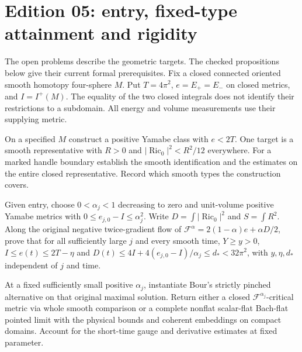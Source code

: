\section{Edition 05: entry, fixed-type attainment and rigidity}
\label{sec:ed05}
The open problems describe the geometric targets. The checked propositions below give their current formal prerequisites. Fix a closed connected oriented
smooth homotopy four-sphere $M$. Put $T=4\pi^2$,
$e=E_+=E_-$ on closed metrics, and $I=I^+(M)$.
The equality of the two closed integrals does not identify their restrictions
to a subdomain. All energy and volume measurements use their supplying metric.

\begin{openproblem}
\label{prop:ed05-entry}
On a specified $M$ construct a positive Yamabe class with $e<2T$.
One target is a smooth representative with $R>0$ and
$|\operatorname{Ric}_0|^2<R^2/12$ everywhere. For a marked handle
boundary establish the smooth identification and the estimates on the entire
closed representative. Record which smooth types the construction covers.
\end{openproblem}

\begin{openproblem}
\label{prop:ed05-bour-energy}
Given entry, choose $0<\alpha_j<1$ decreasing to zero and unit-volume
positive Yamabe metrics with $0\le e_{j,0}-I\le\alpha_j^2$. Write
$D=\int|\operatorname{Ric}_0|^2$ and $S=\int R^2$. Along the original
negative twice-gradient flow of
$\mathcal F^\alpha=2(1-\alpha)e+\alpha D/2$,
prove that for all sufficiently large $j$ and every smooth time,
$Y\ge y>0$, $I\le e(t)\le 2T-\eta$ and
$D(t)\le4I+4(e_{j,0}-I)/\alpha_j\le d_*<32\pi^2$,
with $y,\eta,d_*$ independent of $j$ and time.
\end{openproblem}

\begin{openproblem}
\label{prop:ed05-bour-alternative}
At a fixed sufficiently small positive $\alpha_j$, instantiate Bour's
strictly pinched alternative on that original maximal solution. Return either
a closed $\mathcal F^{\alpha_j}$-critical metric via whole smooth comparison
or a complete nonflat scalar-flat Bach-flat pointed limit with the
physical bounds and coherent embeddings on compact domains. Account for
the short-time gauge and derivative estimates at fixed parameter.
\end{openproblem}


